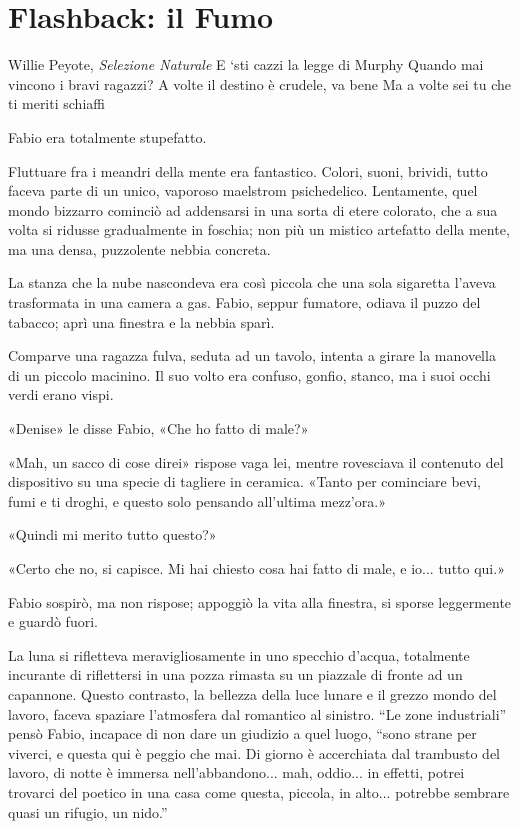 \chapter{Flashback: il Fumo}

\begin{chapquote}{Willie Peyote, \textit{Selezione Naturale}}
	E `sti cazzi la legge di Murphy\newline
	Quando mai vincono i bravi ragazzi?\newline
	A volte il destino è crudele, va bene\newline
	Ma a volte sei tu che ti meriti schiaffi
\end{chapquote}

Fabio era totalmente stupefatto.

Fluttuare fra i meandri della mente era fantastico. Colori, suoni, brividi, tutto faceva parte di un unico, vaporoso maelstrom psichedelico. Lentamente, quel mondo bizzarro cominciò ad addensarsi in una sorta di etere colorato, che a sua volta si ridusse gradualmente in foschia; non più un mistico artefatto della mente, ma una densa, puzzolente nebbia concreta.

La stanza che la nube nascondeva era così piccola che una sola sigaretta l'aveva trasformata in una camera a gas. Fabio, seppur fumatore, odiava il puzzo del tabacco; aprì una finestra e la nebbia sparì.

Comparve una ragazza fulva, seduta ad un tavolo, intenta a girare la manovella di un piccolo macinino. Il suo volto era confuso, gonfio, stanco, ma i suoi occhi verdi erano vispi.

«Denise» le disse Fabio, «Che ho fatto di male?»

«Mah, un sacco di cose direi» rispose vaga lei, mentre rovesciava il contenuto del dispositivo su una specie di tagliere in ceramica. «Tanto per cominciare bevi, fumi e ti droghi, e questo solo pensando all'ultima mezz'ora.»

«Quindi mi merito tutto questo?»

«Certo che no, si capisce. Mi hai chiesto cosa hai fatto di male, e io... tutto qui.»

Fabio sospirò, ma non rispose; appoggiò la vita alla finestra, si sporse leggermente e guardò fuori.

La luna si rifletteva meravigliosamente in uno specchio d'acqua, totalmente incurante di riflettersi in una pozza rimasta su un piazzale di fronte ad un capannone. Questo contrasto, la bellezza della luce lunare e il grezzo mondo del lavoro, faceva spaziare l'atmosfera dal romantico al sinistro. ``Le zone industriali'' pensò Fabio, incapace di non dare un giudizio a quel luogo, ``sono strane per viverci, e questa qui è peggio che mai. Di giorno è accerchiata dal trambusto del lavoro, di notte è immersa nell'abbandono... mah, oddio... in effetti, potrei trovarci del poetico in una casa come questa, piccola, in alto... potrebbe sembrare quasi un rifugio, un nido.''

